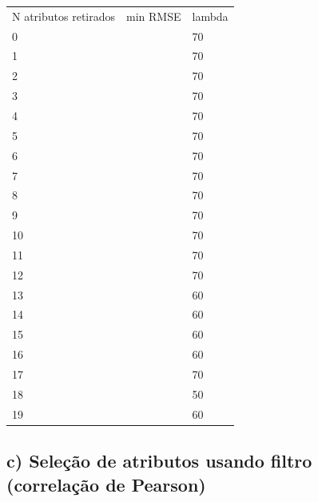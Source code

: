 \documentclass[a4paper, 12pt]{article}
\begin{document}
\begin{table}[]
\begin{tabular}{lll}
N atributos retirados & min RMSE & lambda \\
0                     &          & 70     \\
1                     &          & 70     \\
2                     &          & 70     \\
3                     &          & 70     \\
4                     &          & 70     \\
5                     &          & 70     \\
6                     &          & 70     \\
7                     &          & 70     \\
8                     &          & 70     \\
9                     &          & 70     \\
10                    &          & 70     \\
11                    &          & 70     \\
12                    &          & 70     \\
13                    &          & 60     \\
14                    &          & 60     \\
15                    &          & 60     \\
16                    &          & 60     \\
17                    &          & 70     \\
18                    &          & 50     \\
19                    &          & 60    
\end{tabular}
\end{table}


\subsection*{c) Seleção de atributos usando filtro (correlação de Pearson)}
\end{document}
